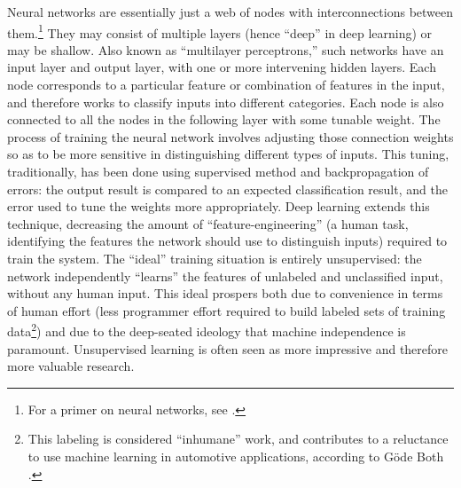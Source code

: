 
Neural networks are essentially just a web of nodes with
interconnections between them.\footnote{For a primer on neural
  networks, see \cite{neuralJordan}.} They may consist of multiple layers
(hence ``deep'' in deep learning) or may be shallow. Also known as
``multilayer perceptrons,'' such networks have an input layer and
output layer, with one or more intervening hidden layers. Each node
corresponds to a particular feature or combination of features in the
input, and therefore works to classify inputs into different
categories. Each node is also connected to all the nodes in the
following layer with some tunable weight. The process of training the
neural network involves adjusting those connection weights so as to
be more sensitive in distinguishing different types of
inputs. This tuning,
traditionally, has been done using supervised method and
backpropagation of errors: the output result is compared to an
expected classification result, and the error used to tune the weights
more appropriately. Deep learning extends this technique, decreasing
the amount of ``feature-engineering'' (a human task, identifying the
features the network should use to distinguish inputs) required to
train the system. The ``ideal'' training situation is entirely
unsupervised: the network independently ``learns'' the features of
unlabeled and unclassified input, without any human input. This ideal
prospers both due to convenience in terms of human effort (less
programmer effort required to build labeled sets of training
data\footnote{This labeling is considered ``inhumane'' work, and contributes to
a reluctance to use machine learning in automotive applications,
according to G\"{o}de Both \cite{bothpt2}.}) and
due to the deep-seated ideology that machine independence is
paramount. Unsupervised learning is often seen as more impressive and
therefore more valuable research.

